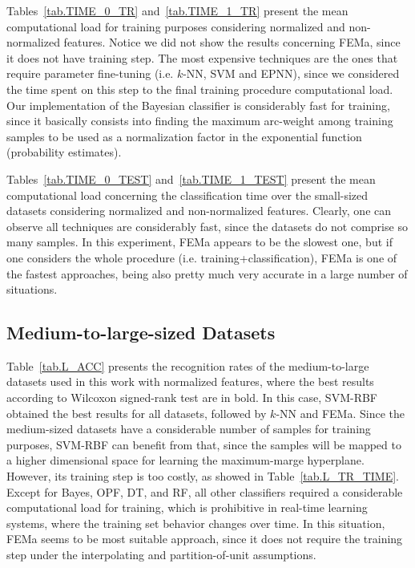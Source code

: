 





Tables~\ref{tab.TIME_0_TR} and~\ref{tab.TIME_1_TR} present the mean computational load for training purposes considering normalized and non-normalized features. Notice we did not show the results concerning FEMa, since it does not have training step. The most expensive techniques are the ones that require parameter fine-tuning (i.e. $k$-NN, SVM and EPNN), since we considered the time spent on this step to the final training procedure computational load. Our implementation of the Bayesian classifier is considerably fast for training, since it basically consists into finding the maximum arc-weight among training samples to be used as a normalization factor in the exponential function (probability estimates).





Tables~\ref{tab.TIME_0_TEST} and~\ref{tab.TIME_1_TEST} present the mean computational load concerning the classification time over the small-sized datasets considering normalized and non-normalized features. Clearly, one can observe all techniques are considerably fast, since the datasets do not comprise so many samples. In this experiment, FEMa appears to be the slowest one, but if one considers the whole procedure (i.e. training+classification), FEMa is one of the fastest approaches, being also pretty much very accurate in a large number of situations.


\subsection{Medium-to-large-sized Datasets}
\label{ss.medium_to_large}

Table~\ref{tab.L_ACC} presents the recognition rates of the medium-to-large datasets used in this work with normalized features, where the best results according to Wilcoxon signed-rank test are in bold. In this case, SVM-RBF obtained the best results for all datasets, followed by $k$-NN and FEMa. Since the medium-sized datasets have a considerable number of samples for training purposes, SVM-RBF can benefit from that, since the samples will be mapped to a higher dimensional space for learning the maximum-marge hyperplane. However, its training step is too costly, as showed in Table~\ref{tab.L_TR_TIME}. Except for Bayes, OPF, DT, and RF, all other classifiers required a considerable computational load for training, which is prohibitive in real-time learning systems, where the training set behavior changes over time. In this situation, FEMa seems to be most suitable approach, since it does not require the training step under the interpolating and partition-of-unit assumptions.

